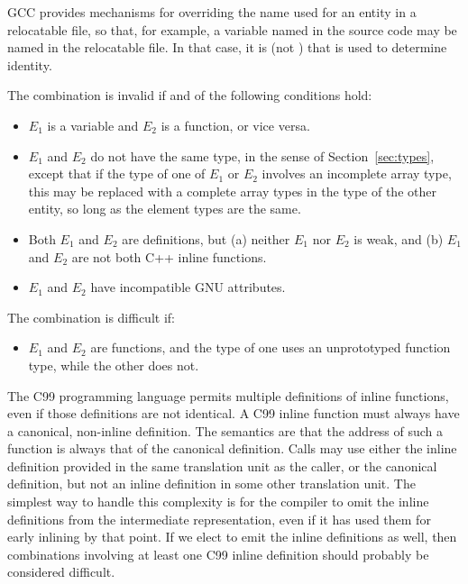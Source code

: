 \begin{note}
 GCC provides mechanisms for overriding the name used for an entity in
 a relocatable file, so that, for example, a variable named 
 in the source code may be named  in the relocatable file.  In
 that case, it is  (not ) that is used to determine
 identity.
\end{note}

The combination is invalid if and of the following conditions hold:
\begin{itemize}
\item $E_1$ is a variable and $E_2$ is a function, or vice versa.

\item $E_1$ and $E_2$ do not have the same type, in the sense of
Section~\ref{sec:types}, except that if the type of one of $E_1$ or $E_2$
involves an incomplete array type, this may be replaced with a complete
array types in the type of the other entity, so long as the element
types are the same.

\item Both $E_1$ and $E_2$ are definitions, but (a) neither $E_1$ nor
  $E_2$ is weak, and (b) $E_1$ and $E_2$ are not both C++ inline
  functions.

\item $E_1$ and $E_2$ have incompatible GNU attributes.
\end{itemize}

The combination is difficult if:
\begin{itemize}
\item $E_1$ and $E_2$ are functions, and the type of one uses an
  unprototyped function type, while the other does not.
\end{itemize}

\begin{note}
The C99 programming language permits multiple definitions of inline
functions, even if those definitions are not identical.  A C99 inline
function must always have a canonical, non-inline definition.  The
semantics are that the address of such a function is always that of
the canonical definition.  Calls may use either the inline definition
provided in the same translation unit as the caller, or the canonical
definition, but not an inline definition in some other translation
unit.  The simplest way to handle this complexity is for the compiler
to omit the inline definitions from the intermediate representation,
even if it has used them for early inlining by that point.  If we
elect to emit the inline definitions as well, then combinations
involving at least one C99 inline definition should probably be
considered difficult.
\end{note} 

